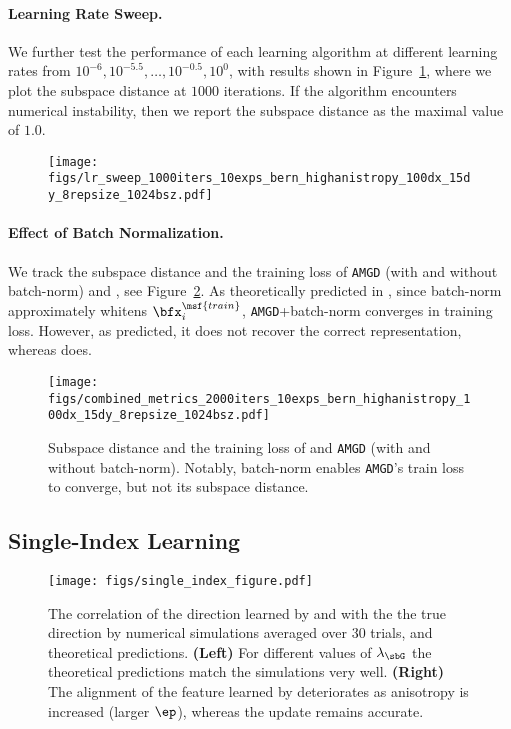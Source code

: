 \ifshort
\else
  \paragraph{Learning Rate Sweep.}
    We further test the performance of each learning algorithm at different learning rates from \(10^{-6}, 10^{-5.5}, \ldots, 10^{-0.5}, 10^{0}\), with results shown in Figure~\ref{fig:lr_sweep}, where we plot the subspace distance at \(1000\) iterations.
    If the algorithm encounters numerical instability, then we report the subspace distance as the maximal value of \(1.0\).
    
    
    \begin{figure}[ht]
    \centering
    \texttt{[image: figs/lr\_sweep\_1000iters\_10exps\_bern\_highanistropy\_100dx\_15dy\_8repsize\_1024bsz.pdf]}
    \caption{}
    \label{fig:lr_sweep}
    \end{figure}
\fi
\vspace{-0.3cm}
\paragraph{Effect of Batch Normalization.} We track the subspace distance and the training loss of \texttt{AMGD} (with and without batch-norm) and \KFAC, see Figure~\ref{fig:batchnorm_subpace_dist}. As theoretically predicted in , since batch-norm approximately whitens $\bfx_i^{\msf{train}}$, \texttt{AMGD}+batch-norm converges in training loss. However, as predicted, it does not recover the correct representation, whereas \KFAC does.
\begin{figure}[h!]
\centering
\texttt{[image: figs/combined\_metrics\_2000iters\_10exps\_bern\_highanistropy\_100dx\_15dy\_8repsize\_1024bsz.pdf]}
\caption{Subspace distance and the training loss of \KFAC and \texttt{AMGD} (with and without batch-norm). Notably, batch-norm enables \texttt{AMGD}'s train loss to converge, but not its subspace distance.}
\label{fig:batchnorm_subpace_dist}
\end{figure}

\subsection{Single-Index Learning}
\label{sec:single_index_exps}

\begin{figure*}[t]
    \centering
    \texttt{[image: figs/single\_index\_figure.pdf]}
    \caption{%
    The correlation of the direction learned by \SGD and \KFAC with the the true direction by numerical simulations averaged over 30 trials, and theoretical predictions.
    \textbf{(Left)} For different values of $\lambda_\sbG$ the theoretical predictions match the simulations very well.
    \textbf{(Right)} The alignment of the feature learned by \SGD deteriorates as anisotropy is increased (larger $\ep$), whereas the \KFAC update remains accurate.}%
    \label{fig:single_index}
\end{figure*}

